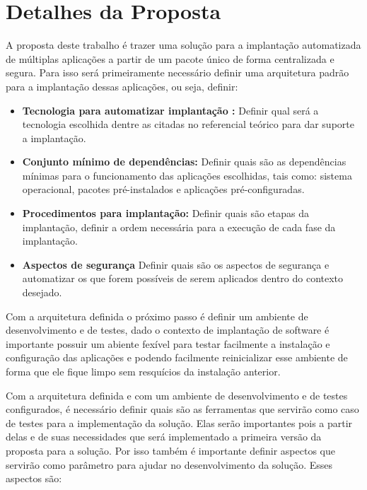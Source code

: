 \section{Detalhes da Proposta}

A proposta deste trabalho é trazer uma solução para a implantação automatizada
de múltiplas aplicações a partir de um pacote único de forma centralizada e segura.
Para isso será primeiramente necessário definir uma arquitetura padrão para a
implantação dessas aplicações, ou seja, definir:

\begin{itemize}
  \item  \textbf{Tecnologia para automatizar implantação :}  Definir qual será a
  tecnologia escolhida dentre as citadas no referencial teórico para dar suporte
  a implantação.
  \item  \textbf{Conjunto mínimo de dependências:} Definir quais são as dependências
  mínimas para o funcionamento das aplicações escolhidas, tais como: sistema operacional,
  pacotes pré-instalados e aplicações pré-configuradas.
  \item  \textbf{Procedimentos para implantação:} Definir quais são etapas da implantação,
  definir a ordem necessária para a execução de cada fase da implantação.
  \item  \textbf{Aspectos de segurança} Definir quais são os aspectos de segurança
  e automatizar os que forem possíveis de serem aplicados dentro do contexto desejado.
\end{itemize}

Com a arquitetura definida o próximo passo é definir um ambiente de desenvolvimento e de
testes, dado o contexto de implantação de software é importante possuir um abiente fexível para
testar facilmente a instalação e configuração das aplicações e podendo facilmente
reinicializar esse ambiente de forma que ele fique limpo sem resquícios da instalação
anterior.

Com a arquitetura definida e com um ambiente de desenvolvimento e de testes configurados, é
necessário definir quais são as ferramentas que servirão como caso de testes
para a implementação da solução. Elas serão importantes pois a partir delas
e de suas necessidades que será implementado a primeira versão da proposta para
a solução. Por isso também é importante definir aspectos que servirão como parâmetro
para ajudar no desenvolvimento da solução. Esses aspectos são:

